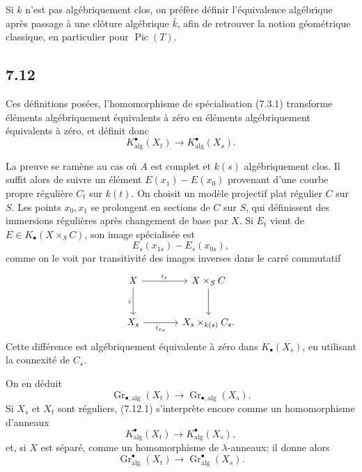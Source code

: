 \documentclass[11pt]{article}
\newcommand{\Gr}{\operatorname{Gr}}
\providecommand{\Pic}{\operatorname{Pic}}
\providecommand{\Gr}{\operatorname{Gr}}
\providecommand{\Gr}{\operatorname{G}}
\begin{document}
Si \(k\) n'est pas algébriquement clos, on préfère définir l'équivalence algébrique après passage à une clôture algébrique \(\bar k\), afin de retrouver la notion géométrique classique, en particulier pour \(\Pic(T)\).

\subsection*{7.12}
Ces définitions posées, l'homomorphisme de spécialisation (7.3.1) transforme éléments algébriquement équivalents à zéro en éléments algébriquement équivalents à zéro, et définit donc
\begin{equation}\tag{7.12.1}
  K^\bullet_{\mathrm{alg}}(X_t)\longrightarrow K^\bullet_{\mathrm{alg}}(X_s).
\end{equation}

La preuve se ramène au cas où \(A\) est complet et \(k(s)\) algébriquement clos. Il suffit alors de suivre un élément \(E(x_1)-E(x_0)\) provenant d'une courbe propre régulière \(C_t\) sur \(k(t)\). On choisit un modèle projectif plat régulier \(C\) sur \(S\). Les points \(x_0,x_1\) se prolongent en sections de \(C\) sur \(S\), qui définissent des immersions régulières après changement de base par \(X\). Si \(E_t\) vient de \(E\in K_\bullet(X\times_SC)\), son image spécialisée est
\[
  E_s(x_{1s})-E_s(x_{0s}),
\]
comme on le voit par transitivité des images inverses dans le carré commutatif
\[
\begin{tikzcd}[column sep=large,row sep=large]
X \arrow[r,"i_x"] \arrow[d,"i"'] & X\times_S C \arrow[d]\\
X_s \arrow[r,"i_{x_s}"'] & X_s\times_{k(s)}C_s.
\end{tikzcd}
\]
Cette différence est algébriquement équivalente à zéro dans \(K_\bullet(X_s)\), en utilisant la connexité de \(C_s\).

On en déduit
\begin{equation}\tag{7.12.2}
  \Gr_{\bullet,\mathrm{alg}}(X_t)\longrightarrow
  \Gr_{\bullet,\mathrm{alg}}(X_s).
\end{equation}
Si \(X_s\) et \(X_t\) sont réguliers, (7.12.1) s'interprète encore comme un homomorphisme d'anneaux
\begin{equation}\tag{7.12.3}
  K^\bullet_{\mathrm{alg}}(X_t)\longrightarrow K^\bullet_{\mathrm{alg}}(X_s),
\end{equation}
et, si \(X\) est séparé, comme un homomorphisme de \(\lambda\)-anneaux; il donne alors
\begin{equation}\tag{7.12.4}
  \Gr^\bullet_{\mathrm{alg}}(X_t)\longrightarrow \Gr^\bullet_{\mathrm{alg}}(X_s).
\end{equation}
\end{document}
